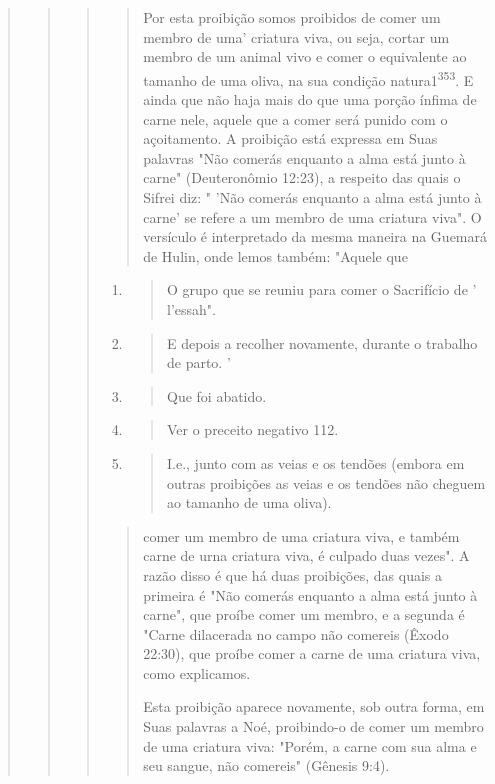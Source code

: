 \begin{quote}
\begin{quote}
\begin{quote}
\begin{quote}
Por esta proibição somos proibidos de comer um membro de uma' criatura
viva, ou seja, cortar um membro de um animal vivo e comer o equi­valente
ao tamanho de uma oliva, na sua condição natura1\textsuperscript{353}. E
ainda que não haja mais do que uma porção ínfima de carne nele, aquele
que a comer será punido com o açoitamento. A proibição está expressa em
Suas palavras "Não comerás enquanto a alma está junto à carne"
(Deuteronômio 12:23), a respei­to das quais o Sifrei diz: " 'Não comerás
enquanto a alma está junto à carne' se refere a um membro de uma
criatura viva". O versículo é interpretado da mesma maneira na Guemará
de Hulin, onde lemos também: "Aquele que
\end{quote}

\begin{enumerate}
\def\labelenumi{\arabic{enumi}.}
\setcounter{enumi}{348}
\item
 \begin{quote}
 O grupo que se reuniu para comer o Sacrifício de ' l'essah".
 \end{quote}
\item
 \begin{quote}
 E depois a recolher novamente, durante o trabalho de parto. '
 \end{quote}
\item
 \begin{quote}
 Que foi abatido.
 \end{quote}
\item
 \begin{quote}
 Ver o preceito negativo 112.
 \end{quote}
\item
 \begin{quote}
 I.e., junto com as veias e os tendões (embora em outras proibições as
 veias e os tendões não cheguem ao tamanho de uma oliva).
 \end{quote}
\end{enumerate}

\begin{quote}

comer um membro de uma criatura viva, e também carne de urna criatura
vi­va, é culpado duas vezes". A razão disso é que há duas proibições,
das quais a primeira é "Não comerás enquanto a alma está junto à carne",
que proíbe comer um membro, e a segunda é "Carne dilacerada no campo não
come­reis (Êxodo 22:30), que proíbe comer a carne de uma criatura viva,
como explicamos.

Esta proibição aparece novamente, sob outra forma, em Suas pala­vras a
Noé, proibindo-o de comer um membro de uma criatura viva: "Porém, a
carne com sua alma e seu sangue, não comereis" (Gênesis 9:4).


\end{quote}
\end{quote}
\end{quote}
\end{quote}
